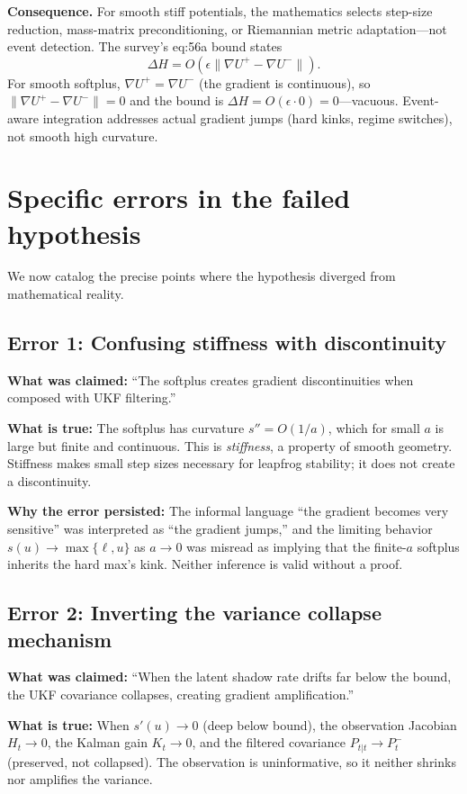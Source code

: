 \textbf{Consequence.} For smooth stiff potentials, the mathematics selects step-size reduction, mass-matrix preconditioning, or Riemannian metric adaptation—not event detection. The survey's eq:56a bound states
\[
\Delta H = O(\epsilon \|\nabla U^+ - \nabla U^-\|).
\]
For smooth softplus, $\nabla U^+ = \nabla U^-$ (the gradient is continuous), so $\|\nabla U^+ - \nabla U^-\| = 0$ and the bound is $\Delta H = O(\epsilon \cdot 0) = 0$—vacuous. Event-aware integration addresses actual gradient jumps (hard kinks, regime switches), not smooth high curvature.

\section{Specific errors in the failed hypothesis}

We now catalog the precise points where the hypothesis diverged from mathematical reality.

\subsection{Error 1: Confusing stiffness with discontinuity}

\textbf{What was claimed:} ``The softplus creates gradient discontinuities when composed with UKF filtering.''

\textbf{What is true:} The softplus has curvature $s'' = O(1/a)$, which for small $a$ is large but finite and continuous. This is \emph{stiffness}, a property of smooth geometry. Stiffness makes small step sizes necessary for leapfrog stability; it does not create a discontinuity.

\textbf{Why the error persisted:} The informal language ``the gradient becomes very sensitive'' was interpreted as ``the gradient jumps,'' and the limiting behavior $s(u) \to \max\{\ell, u\}$ as $a \to 0$ was misread as implying that the finite-$a$ softplus inherits the hard max's kink. Neither inference is valid without a proof.

\subsection{Error 2: Inverting the variance collapse mechanism}

\textbf{What was claimed:} ``When the latent shadow rate drifts far below the bound, the UKF covariance collapses, creating gradient amplification.''

\textbf{What is true:} When $s'(u) \to 0$ (deep below bound), the observation Jacobian $H_t \to 0$, the Kalman gain $K_t \to 0$, and the filtered covariance $P_{t|t} \to P_t^-$ (preserved, not collapsed). The observation is uninformative, so it neither shrinks nor amplifies the variance.

